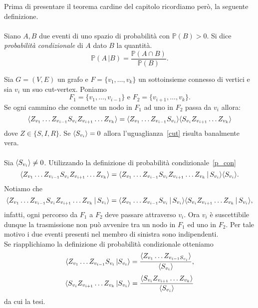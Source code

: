 Prima di presentare il teorema cardine del capitolo  
ricordiamo per\`o, la seguente definizione.\\ \\
Siano $A,B$ due eventi di uno spazio di probabilit\`a con $\mathbb{P}(B)>0$. Si dice \textit{probabilit\`a condizionale} di $A$ dato $B$ la quantit\`a.
\begin{equation} 
\label{p_con}
\mathbb{P}(A\, \vert B) = \frac{ \mathbb{P}(A\cap B)}{\mathbb{P}(B)}.
\end{equation}

\begin{thm}\label{th_cut-vertex}
Sia $G=(V,E)$ un grafo e $F=\{ v_1, \dots, v_k\}$ un sottoinsieme connesso di vertici e sia $v_i$ un suo cut-vertex. Poniamo  $$ F_1 = \{ v_1, \dots, v_{i-1}\} \text{ e }  F_2 =\{ v_{i+1}, \dots, v_k\}.$$ 
Se ogni cammino che connette un nodo in $F_1$ ad uno in $F_2$ passa da $v_i$ allora: 
\begin{equation}\label{cut}\langle  Z_{v_1}\dots Z_{v_{i-1}} S_{v_i} Z_{v_{i+1}} \dots Z_{v_k} \rangle = \langle  Z_{v_1}\dots Z_{v_{i-1}} S_{v_i} \rangle \langle S_{v_i}  Z_{v_{i+1}} \dots Z_{v_k} \rangle	
\end{equation}
dove $Z\in \{ S,I,R\}$. 
\proof  
Se $\langle S_{v_i} \rangle=0$ allora l'uguaglianza~\eqref{cut} risulta banalmente vera.\\ \\ 
Sia $\langle S_{v_i} \rangle\neq 0 $. Utilizzando la definizione di  probabilit\`a condizionale~\eqref{p_con}
$$ \langle  Z_{v_1}\dots Z_{v_{i-1}} S_{v_i} Z_{v_{i+1}}\dots Z_{v_k} \rangle = \langle  Z_{v_1}\dots Z_{v_{i-1}} S_{v_i} Z_{v_{i+1}}\dots Z_{v_k}\, \vert \, S_{v_i} \rangle \langle S_{v_i} \rangle.$$
Notiamo che $$ \langle  Z_{v_1}\dots Z_{v_{i-1}} S_{v_i} Z_{v_{i+1}}\dots Z_{v_k}\, \vert \, S_{v_i} \rangle = \langle  Z_{v_1}\dots Z_{v_{i-1}} S_{v_i} \, \vert\, S_{v_i} \rangle \langle S_{v_i}Z_{v_{i+1}}\dots Z_{v_k}\, \vert \, S_{v_i} \rangle,$$ 
infatti, ogni percorso da $F_1$ a $F_2$ deve passare attraverso $v_i$. Ora  $v_i$ \`e suscettibile dunque la trasmissione non pu\`o avvenire tra un nodo in $F_1$ ed uno in $F_2$. Per tale motivo i due eventi presenti nel membro di sinistra sono indipendenti.\\
Se riapplichiamo la definizione di probabilit\`a condizionale otteniamo  
$$ \langle  Z_{v_1} \dots Z_{v_{i-1}}S_{v_i} \, \vert S_{v_i} \rangle =\frac{ \langle Z_{v_1} \dots Z_{v_{i-1} S_{v_i}} \rangle}{\langle  S_{v_i} \rangle},$$
$$ \langle  S_{v_i} Z_{v_{i+1}}\dots Z_{v_{k}} \, \vert S_{v_i} \rangle =\frac{ \langle S_{v_i}Z_{v_{i+1}} \dots Z_{v_{k}} \rangle}{\langle  S_{v_i} \rangle}$$
da cui la tesi.
\endproof
\end{thm}
